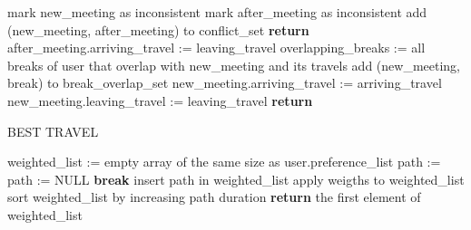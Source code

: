 \begin{algorithm}
\begin{algorithmic}[1]
				\State mark new\_meeting as inconsistent
				\State mark after\_meeting as inconsistent
				\State add (new\_meeting, after\_meeting) to conflict\_set
				\State \textbf{return}	
			\Else
				\State after\_meeting.arriving\_travel := leaving\_travel					
			\EndIf
		\EndIf
		\Statex
		\State overlapping\_breaks := all breaks of user that overlap with new\_meeting and its travels
			\State {}
			\State add (new\_meeting, break) to break\_overlap\_set
		\EndFor
		\State new\_meeting.arriving\_travel := arriving\_travel
		\State new\_meeting.leaving\_travel := leaving\_travel
		\State \textbf{return}
	\end{algorithmic}
\addtocounter{algorithm}{-1}
\end{algorithm}

\begin{algorithm}
\renewcommand\thealgorithm{}
\caption{BEST TRAVEL}
	\begin{algorithmic}[1]
		\State weighted\_list := empty array of the same size as user.preference\_list
			\State path := 
					\State path := NULL
					\State \textbf{break}
				\EndIf
			\EndFor
				\State insert path in weighted\_list
			\EndIf
		\EndFor
		\State apply weigths to weighted\_list
		\State sort weighted\_list by increasing path duration
		\State \textbf{return} the first element of weighted\_list
	\end{algorithmic}
\addtocounter{algorithm}{-1}
\end{algorithm}